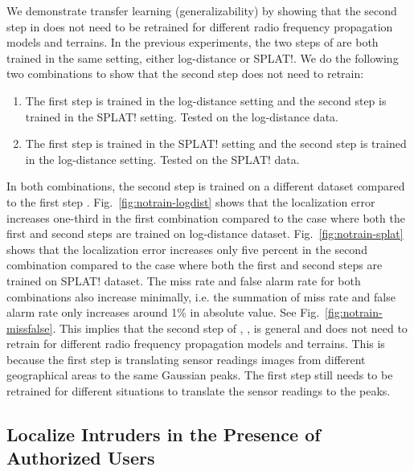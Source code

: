 We demonstrate transfer learning (generalizability) by showing that the second step in \our does not need to be retrained for different radio frequency propagation models and terrains.
In the previous experiments, the two steps of \our are both trained in the same setting, either log-distance or SPLAT!.
We do the following two combinations to show that the second step does not need to retrain:
\begin{enumerate}
    \item The first step is trained in the log-distance setting and the second step is trained in the SPLAT! setting. Tested on the log-distance data.
    \item The first step is trained in the SPLAT! setting and the second step is trained in the log-distance setting. Tested on the SPLAT! data.
\end{enumerate}
In both combinations, the second step \yolocust is trained on a different dataset compared to the first step \imgimg. 
Fig.~\ref{fig:notrain-logdist} shows that the localization error increases one-third in the first combination compared to the case where both the first and second steps are trained on log-distance dataset. 
Fig.~\ref{fig:notrain-splat} shows that the localization error increases only five percent in the second combination compared to the case where both the first and second steps are trained on SPLAT! dataset.
The miss rate and false alarm rate for both combinations also increase minimally, i.e. the summation of miss rate and false alarm rate only increases around 1\% in absolute value. See Fig.~\ref{fig:notrain-missfalse}.
This implies that the second step of \our, \yolocust, is general and does not need to retrain for different radio frequency propagation models and terrains.
This is because the first step \imgimg is translating sensor readings images from different geographical areas to the same Gaussian peaks.
The first step \imgimg still needs to be retrained for different situations to translate the sensor readings to the peaks.


\subsection{Localize Intruders in the Presence of Authorized Users}
\label{subsec:authorzedeval}


